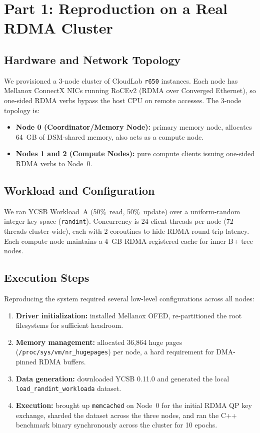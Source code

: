 \documentclass[11pt]{article}
\begin{document}
\section{Part 1: Reproduction on a Real RDMA Cluster}
\label{sec:reproduction}

\subsection{Hardware and Network Topology}
We provisioned a 3-node cluster of CloudLab \texttt{r650} instances. Each node has Mellanox ConnectX NICs running RoCEv2 (RDMA over Converged Ethernet), so one-sided RDMA verbs bypass the host CPU on remote accesses. The 3-node topology is:
\begin{itemize}
    \item \textbf{Node 0 (Coordinator/Memory Node):} primary memory node, allocates 64~GB of DSM-shared memory, also acts as a compute node.
    \item \textbf{Nodes 1 and 2 (Compute Nodes):} pure compute clients issuing one-sided RDMA verbs to Node~0.
\end{itemize}

\subsection{Workload and Configuration}
We ran YCSB Workload~A (50\%~read, 50\%~update) over a uniform-random integer key space (\texttt{randint}). Concurrency is 24 client threads per node (72 threads cluster-wide), each with 2 coroutines to hide RDMA round-trip latency. Each compute node maintains a 4~GB RDMA-registered cache for inner B+ tree nodes.

\subsection{Execution Steps}
Reproducing the system required several low-level configurations across all nodes:
\begin{enumerate}
    \item \textbf{Driver initialization:} installed Mellanox OFED, re-partitioned the root filesystems for sufficient headroom.
    \item \textbf{Memory management:} allocated 36{,}864 huge pages (\texttt{/proc/sys/vm/nr\_hugepages}) per node, a hard requirement for DMA-pinned RDMA buffers.
    \item \textbf{Data generation:} downloaded YCSB 0.11.0 and generated the local \texttt{load\_randint\_workloada} dataset.
    \item \textbf{Execution:} brought up \texttt{memcached} on Node~0 for the initial RDMA QP key exchange, sharded the dataset across the three nodes, and ran the C++ benchmark binary synchronously across the cluster for 10 epochs.
\end{enumerate}
\end{document}
